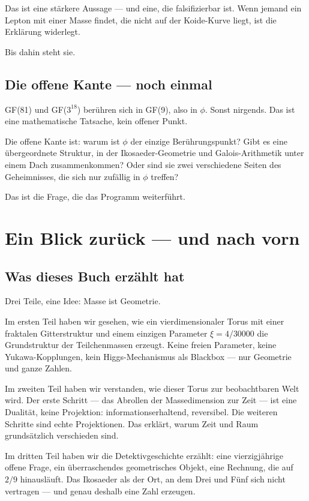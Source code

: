 \documentclass[12pt,oneside]{book}
\begin{document}
Das ist eine stärkere Aussage — und eine, die falsifizierbar ist. Wenn jemand ein Lepton mit einer Masse findet, die nicht auf der Koide-Kurve liegt, ist die Erklärung widerlegt.

Bis dahin steht sie.

\section{Die offene Kante — noch einmal}

GF(81) und GF($3^{18}$) berühren sich in GF(9), also in $\phi$. Sonst nirgends. Das ist eine mathematische Tatsache, kein offener Punkt.

Die offene Kante ist: warum ist $\phi$ der einzige Berührungspunkt? Gibt es eine übergeordnete Struktur, in der Ikosaeder-Geometrie und Galois-Arithmetik unter einem Dach zusammenkommen? Oder sind sie zwei verschiedene Seiten des Geheimnisses, die sich nur zufällig in $\phi$ treffen?

Das ist die Frage, die das Programm weiterführt.

\chapter{Ein Blick zurück — und nach vorn}

\section{Was dieses Buch erzählt hat}

Drei Teile, eine Idee: Masse ist Geometrie.

Im ersten Teil haben wir gesehen, wie ein vierdimensionaler Torus mit einer fraktalen Gitterstruktur und einem einzigen Parameter $\xi = 4/30000$ die Grundstruktur der Teilchenmassen erzeugt. Keine freien Parameter, keine Yukawa-Kopplungen, kein Higgs-Mechanismus als Blackbox — nur Geometrie und ganze Zahlen.

Im zweiten Teil haben wir verstanden, wie dieser Torus zur beobachtbaren Welt wird. Der erste Schritt — das Abrollen der Massedimension zur Zeit — ist eine Dualität, keine Projektion: informationserhaltend, reversibel. Die weiteren Schritte sind echte Projektionen. Das erklärt, warum Zeit und Raum grundsätzlich verschieden sind.

Im dritten Teil haben wir die Detektivgeschichte erzählt: eine vierzigjährige offene Frage, ein überraschendes geometrisches Objekt, eine Rechnung, die auf $2/9$ hinausläuft. Das Ikosaeder als der Ort, an dem Drei und Fünf sich nicht vertragen — und genau deshalb eine Zahl erzeugen.
\end{document}
